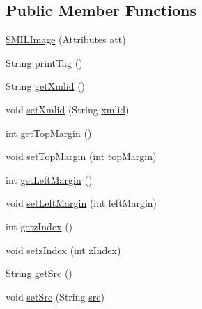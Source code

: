 \subsection*{Public Member Functions}
\begin{DoxyCompactItemize}
\item 
\hyperlink{classcsc440_1_1nuf_1_1components_1_1_s_m_i_l_image_a30d35f0657c429743a53c840f6911000}{S\-M\-I\-L\-Image} (Attributes att)
\item 
String \hyperlink{classcsc440_1_1nuf_1_1components_1_1_s_m_i_l_image_aae0e9e20f89e2700c6de7fe910325ba9}{print\-Tag} ()
\item 
String \hyperlink{classcsc440_1_1nuf_1_1components_1_1_s_m_i_l_image_a5783ed68e651d5f2719c267b017bb688}{get\-Xmlid} ()
\item 
void \hyperlink{classcsc440_1_1nuf_1_1components_1_1_s_m_i_l_image_ab031dd4583f23351e60e84a223f07080}{set\-Xmlid} (String \hyperlink{classcsc440_1_1nuf_1_1components_1_1_s_m_i_l_image_afd55b46f4defec7cf41823ad02b878d9}{xmlid})
\item 
int \hyperlink{classcsc440_1_1nuf_1_1components_1_1_s_m_i_l_image_aadcfef3d7b9a023495f5f31676fef88b}{get\-Top\-Margin} ()
\item 
void \hyperlink{classcsc440_1_1nuf_1_1components_1_1_s_m_i_l_image_ac147150e57bc4a8137a2d1829108992c}{set\-Top\-Margin} (int top\-Margin)
\item 
int \hyperlink{classcsc440_1_1nuf_1_1components_1_1_s_m_i_l_image_ae39611dc016972a96a660c9884dcae5a}{get\-Left\-Margin} ()
\item 
void \hyperlink{classcsc440_1_1nuf_1_1components_1_1_s_m_i_l_image_a244835e5f63dc4cbe3d268d8a8910c0b}{set\-Left\-Margin} (int left\-Margin)
\item 
int \hyperlink{classcsc440_1_1nuf_1_1components_1_1_s_m_i_l_image_a5702599838bdddbbc8fea7700bf45bd2}{getz\-Index} ()
\item 
void \hyperlink{classcsc440_1_1nuf_1_1components_1_1_s_m_i_l_image_a148b84198ddbd7035b04577fa713fc91}{setz\-Index} (int \hyperlink{classcsc440_1_1nuf_1_1components_1_1_s_m_i_l_image_a9aeac60e77b5bd6e8fe368bd49016def}{z\-Index})
\item 
String \hyperlink{classcsc440_1_1nuf_1_1components_1_1_s_m_i_l_image_ad1c3a41607563a99bcf80b3b6d208337}{get\-Src} ()
\item 
void \hyperlink{classcsc440_1_1nuf_1_1components_1_1_s_m_i_l_image_a180c0a2f78b4aad213fe55702be84d72}{set\-Src} (String \hyperlink{classcsc440_1_1nuf_1_1components_1_1_s_m_i_l_image_a87d825fa15d090559671a8aeecd775b0}{src})
\end{DoxyCompactItemize}
